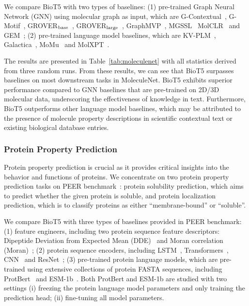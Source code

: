 \documentclass[11pt]{article}
\newcommand{\method}{{BioT5}}
\begin{document}
We compare \method{} with two types of baselines:
(1) pre-trained Graph Neural Network (GNN) using molecular graph as input, which are G-Contextual~\citep{rong2020self}, G-Motif~\citep{rong2020self}, GROVER$_{\rm base}$~\citep{rong2020self}, GROVER$_{\rm large}$~\citep{rong2020self}, GraphMVP~\citep{DBLP:conf/iclr/LiuWLLGT22}, MGSSL~\citep{zhang2021motif} MolCLR~\citep{wang2022molecular} and GEM~\citep{fang2022geometry};
(2) pre-trained language model baselines, which are KV-PLM~\citep{zeng2022deep}, Galactica~\citep{taylor2022galactica}, MoMu~\citep{su2022molecular} and MolXPT~\cite{liu2023molxpt}.

The results are presented in Table~\ref{tab:moleculenet} with all statistics derived from three random runs.
From these results, we can see that \method{} surpasses baselines on most downstream tasks in MoleculeNet.
\method{} exhibits superior performance compared to GNN baselines that are pre-trained on 2D/3D molecular data, underscoring the effectiveness of knowledge in text.
Furthermore, \method{} outperforms other language model baselines, which may be attributed to the presence of molecule property descriptions in scientific contextual text or existing biological database entries.

\subsubsection{Protein Property Prediction}
\label{sec:protein_property_prediction}
Protein property prediction is crucial as it provides critical insights into the behavior and functions of proteins.
We concentrate on two protein property prediction tasks on PEER benchmark~\citep{xu2022peer}: protein solubility prediction, which aims to predict whether the given protein is soluble, and protein localization prediction, which is to classify proteins as either ``membrane-bound'' or ``soluble''.


We compare \method{} with three types of baselines provided in PEER benchmark:
(1) feature engineers, including two protein sequence feature descriptors: Dipeptide Deviation from Expected Mean (DDE)~\citep{saravanan2015harnessing} and Moran correlation (Moran)~\citep{feng2000prediction};
(2) protein sequence encoders, including LSTM~\citep{hochreiter1997long}, Transformers~\citep{vaswani2017attention}, CNN~\citep{o2015introduction} and ResNet~\citep{he2016deep};
(3) pre-trained protein language models, which are pre-trained using extensive collections of protein FASTA sequences, including ProtBert~\citep{elnaggar2021prottrans} and ESM-1b~\citep{rives2021biological}.
Both ProtBert and ESM-1b are studied with two settings 
(i) freezing the protein language model parameters and only training the prediction head;
(ii) fine-tuning all model parameters.
\end{document}
